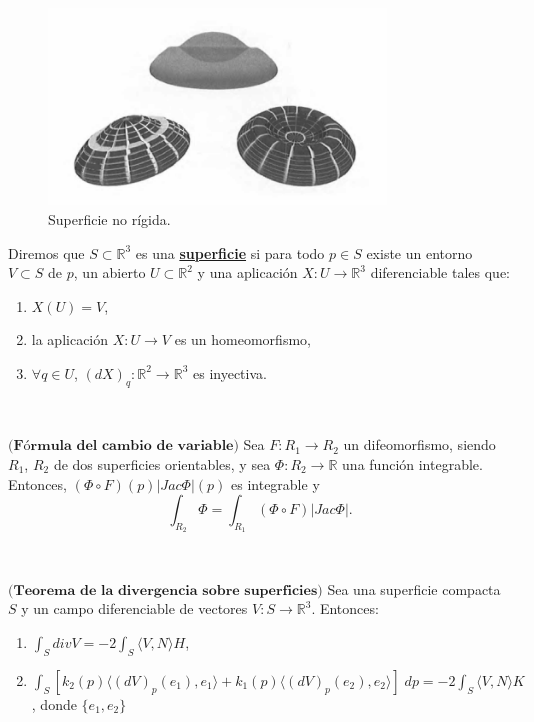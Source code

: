 \begin{figure}
	\begin{center}
		\includegraphics[width=0.8\textwidth]{imagenes/no_rigid}
	\end{center}
	\caption{Superficie no rígida.}
	\label{fig:etiq_2}
\end{figure}




\begin{definicion}
	Diremos que $S \subset \mathbb{R}^3$ es una \underline{\textbf{superficie}} si para todo $p \in S$ existe un entorno $V \subset S$ de $p$, un abierto $U \subset \mathbb{R}^2$ y una aplicación $X : U \to \mathbb{R}^3$ diferenciable tales que:
	\begin{enumerate}
		\item $X(U) = V$,
		\item la aplicación $X : U \to V$ es un homeomorfismo,
		\item $\forall q \in U$, $(dX)_q : \mathbb{R}^2 \to \mathbb{R}^3$ es inyectiva.
	\end{enumerate}
\end{definicion}
${ }$\\

\begin{teorema}
	$\textbf{(Fórmula del cambio de variable)}$ Sea $F : R_1 \to R_2$ un difeomorfismo, siendo $R_1$, $R_2$ de dos superficies orientables, y sea $\Phi : R_2 \to \mathbb{R}$ una función integrable. Entonces, $(\Phi \circ F)(p)|Jac \Phi|(p)$ es integrable y
	\[
	\int_{R_2} \Phi = \int_{R_1} (\Phi \circ F)|Jac \Phi|.
	\]
\end{teorema}
${ }$\\

\begin{teorema}\label{teo:divergencia}
	$\textbf{(Teorema de la divergencia sobre superficies)}$ Sea una superficie compacta $S$ y un campo diferenciable de vectores $V : S \to \mathbb{R}^3$. Entonces:
	\begin{enumerate}
		\item $\int_S div V = -2 \int_S \langle V, N \rangle H$,
		\item $\int_S [k_2(p) \langle (dV)_p(e_1), e_1\rangle + k_1(p) \langle (dV)_p(e_2), e_2 \rangle ] \; dp = -2 \int_S \langle V, N \rangle K$, donde $\{ e_1, e_2 \}$
	\end{enumerate}
\end{teorema}
${ }$\\

